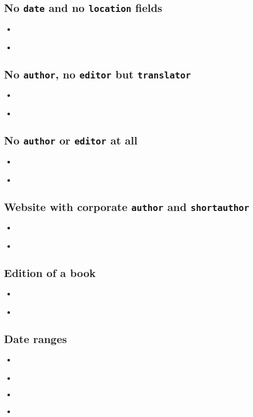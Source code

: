 \documentclass[a4paper,12pt]{scrartcl}
\newcommand{\Feld}[1]{\texttt{#1}}
\begin{document}
\subsection{No \Feld{date} and no \Feld{location} fields}
\begin{itemize}
	\item\cite{fuchs:o:j}%
	\item{}%
\end{itemize}

\subsection{No \Feld{author}, no \Feld{editor} but \Feld{translator}}
\begin{itemize}
	\item\cite{sterk:1777}%
	\item{}%
\end{itemize}

\subsection{No \Feld{author} or \Feld{editor} at all}
\begin{itemize}
	\item\cite{domino:1780}%
	\item{}%
\end{itemize}

\subsection{Website with corporate \Feld{author} and \Feld{shortauthor}}
\begin{itemize}
	\item\cite{kenmore}%
	\item{}%
\end{itemize}

\subsection{Edition of a book}
\begin{itemize}
	\item\cite{fuchs:kh:et:al:1998}%
	\item{}%
\end{itemize}

\subsection{Date ranges}
\begin{itemize}
	\item\cite{bhattacharyya:1973}%
	\item{}%
	\item\cite{cossel:1933-35}%
	\item{}%
\end{itemize}
\end{document}
